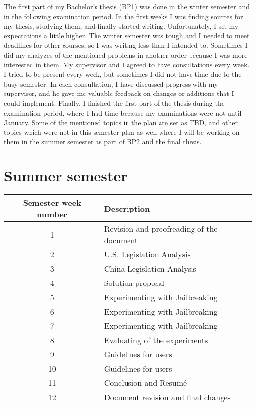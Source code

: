 The first part of my Bachelor's thesis (BP1) was done in the winter semester and in the following examination period. In the first weeks I was finding sources for my thesis, studying them, and finally started writing. Unfortunately, I set my expectations a little higher. The winter semester was tough and I needed to meet deadlines for other courses, so I was writing less than I intended to. Sometimes I did my analyzes of the mentioned problems in another order because I was more interested in them. My supervisor and I agreed to have consultations every week. I tried to be present every week, but sometimes I did not have time due to the busy semester. In each consultation, I have discussed progress with my supervisor, and he gave me valuable feedback on changes or additions that I could implement. Finally, I finished the first part of the thesis during the examination period, where I had time because my examinations were not until January. Some of the mentioned topics in the plan are set as TBD, and other topics which were not in this semester plan as well where I will be working on them in the summer semester as part of BP2 and the final thesis.


\newpage


\section*{Summer semester}

\begin{table}[hp]
    \centering
    \begin{tabular}{|c|l|}
    \hline
    \textbf{Semester week number} & \textbf{Description} \\ \hline

    1 & Revision and proofreading of the document \\ \hline
    2 & U.S. Legislation Analysis \\ \hline
    3 & China Legislation Analysis \\ \hline
    4 & Solution proposal \\ \hline
    5 & Experimenting with Jailbreaking \\ \hline
    6 & Experimenting with Jailbreaking \\ \hline
    7 & Experimenting with Jailbreaking \\ \hline
    8 & Evaluating of the experiments \\ \hline
    9 & Guidelines for users \\ \hline
    10 & Guidelines for users \\ \hline
    11 & Conclusion and Resumé \\ \hline
    12 & Document revision and final changes \\ \hline
    \end{tabular}
\end{table}


